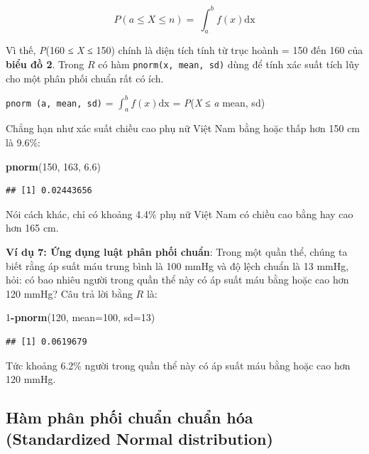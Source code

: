 \documentclass[
]{book}
\newenvironment{Shaded}{\begin{snugshade}}{\end{snugshade}}
\newcommand{\DataTypeTok}[1]{\textcolor[rgb]{0.13,0.29,0.53}{#1}}
\newcommand{\DecValTok}[1]{\textcolor[rgb]{0.00,0.00,0.81}{#1}}
\newcommand{\FloatTok}[1]{\textcolor[rgb]{0.00,0.00,0.81}{#1}}
\newcommand{\KeywordTok}[1]{\textcolor[rgb]{0.13,0.29,0.53}{\textbf{#1}}}
\newcommand{\NormalTok}[1]{#1}
\newcommand{\OperatorTok}[1]{\textcolor[rgb]{0.81,0.36,0.00}{\textbf{#1}}}
\begin{document}
\[P\left( a \leq X \leq n \right) = \ \int_{a}^{b}{f\left( x \right)\text{dx}}\]

Vì thế, \emph{P}(160 ≤ \emph{X} ≤ 150) chính là diện tích tính từ trục hoành = 150 đến 160 của \textbf{biểu đồ 2}. Trong \(R\) có hàm \texttt{pnorm(x,\ mean,\ sd)} dùng để tính xác suất tích lũy cho một phân phối chuẩn rất có ích.

\texttt{pnorm\ (a,\ mean,\ sd)} = \(\int_{a}^{b}{f\left( x \right)\text{dx}}\) = \emph{P}(\emph{X} ≤ \emph{a} \textbar{} mean, sd)

Chẳng hạn như xác suất chiều cao phụ nữ Việt Nam bằng hoặc thấp hơn 150 cm là 9.6\%:

\begin{Shaded}
\begin{Highlighting}[]
\KeywordTok{pnorm}\NormalTok{(}\DecValTok{150}\NormalTok{, }\DecValTok{163}\NormalTok{, }\FloatTok{6.6}\NormalTok{)}
\end{Highlighting}
\end{Shaded}

\begin{verbatim}
## [1] 0.02443656
\end{verbatim}

Nói cách khác, chỉ có khoảng 4.4\% phụ nữ Việt Nam có chiều cao bằng hay cao hơn 165 cm.

\textbf{Ví dụ 7: Ứng dụng luật phân phối chuẩn}: Trong một quần thể, chúng ta biết rằng áp suất máu trung bình là 100 mmHg và độ lệch chuẩn là 13 mmHg, hỏi: có bao nhiêu người trong quần thể này có áp suất máu bằng hoặc cao hơn 120 mmHg? Câu trả lời bằng \(R\) là:

\begin{Shaded}
\begin{Highlighting}[]
\DecValTok{1}\OperatorTok{{-}}\KeywordTok{pnorm}\NormalTok{(}\DecValTok{120}\NormalTok{, }\DataTypeTok{mean=}\DecValTok{100}\NormalTok{, }\DataTypeTok{sd=}\DecValTok{13}\NormalTok{)}
\end{Highlighting}
\end{Shaded}

\begin{verbatim}
## [1] 0.0619679
\end{verbatim}

Tức khoảng 6.2\% người trong quần thể này có áp suất máu bằng hoặc cao hơn 120 mmHg.

\hypertarget{huxe0m-phuxe2n-phux1ed1i-chuux1ea9n-chuux1ea9n-huxf3a-standardized-normal-distribution}{%
\subsection{Hàm phân phối chuẩn chuẩn hóa (Standardized Normal distribution)}\label{huxe0m-phuxe2n-phux1ed1i-chuux1ea9n-chuux1ea9n-huxf3a-standardized-normal-distribution}}
\end{document}
